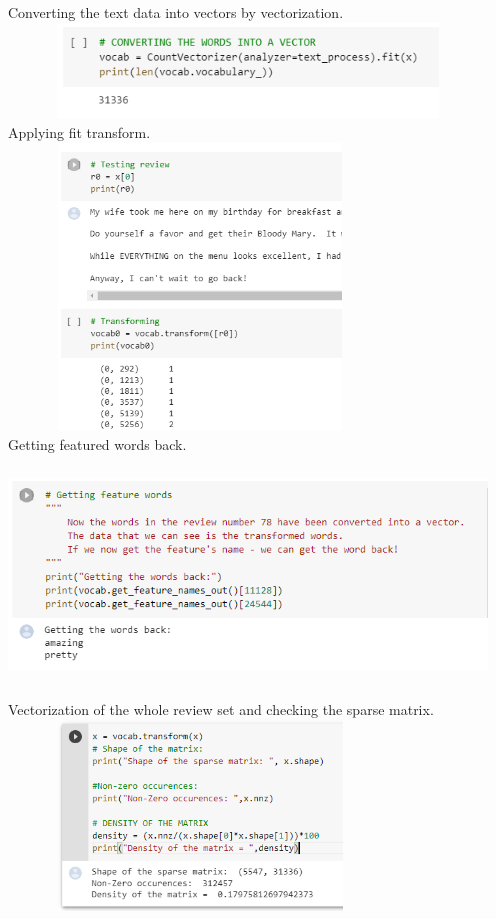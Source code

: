\documentclass[a4paper, 12pt]{report}
\begin{document}
Converting the text data into vectors by vectorization.\\
	\includegraphics[height=1in,width=5in]{12}\\
Applying fit transform.\\
	\includegraphics[height=3in,width=4in]{13}\\
	
	Getting featured words back.\\
	\includegraphics[height=2.5in,width=5in]{14}\\
	Vectorization of the whole review set and checking the sparse matrix.\\
	\includegraphics[height=2in,width=4in]{15}
\end{document}
